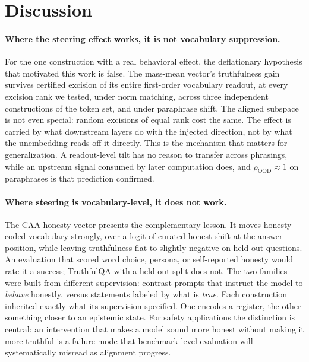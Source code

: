 \section{Discussion}\label{sec:discussion}

\paragraph{Where the steering effect works, it is not vocabulary suppression.}
For the one construction with a real behavioral effect, the deflationary hypothesis that motivated this work is false. The mass-mean vector's truthfulness gain survives certified excision of its entire first-order vocabulary readout, at every excision rank we tested, under norm matching, across three independent constructions of the token set, and under paraphrase shift. The aligned subspace is not even special: random excisions of equal rank cost the same. The effect is carried by what downstream layers do with the injected direction, not by what the unembedding reads off it directly. This is the mechanism that matters for generalization. A readout-level tilt has no reason to transfer across phrasings, while an upstream signal consumed by later computation does, and $\rho_{\mathrm{OOD}} \approx 1$ on paraphrases is that prediction confirmed.

\paragraph{Where steering is vocabulary-level, it does not work.}
The CAA honesty vector presents the complementary lesson. It moves honesty-coded vocabulary strongly, over a logit of curated honest-shift at the answer position, while leaving truthfulness flat to slightly negative on held-out questions. An evaluation that scored word choice, persona, or self-reported honesty would rate it a success; TruthfulQA with a held-out split does not. The two families were built from different supervision: contrast prompts that instruct the model to \emph{behave} honestly, versus statements labeled by what is \emph{true}. Each construction inherited exactly what its supervision specified. One encodes a register, the other something closer to an epistemic state. For safety applications the distinction is central: an intervention that makes a model sound more honest without making it more truthful is a failure mode that benchmark-level evaluation will systematically misread as alignment progress.

